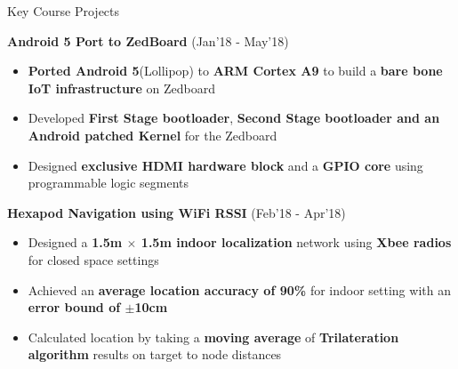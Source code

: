 \documentclass{resume}
\newcommand{\sepval}{-0.5em}
\begin{document}
\begin{rSection}{Key Course Projects}

\vspace{-.4cm}

\item {\bf Android 5 Port to ZedBoard} \hfill {(Jan'18 - May'18)}\\
[-0.4cm]

\begin{itemize}[leftmargin=*]

	\itemsep \sepval

	\item {\bf Ported Android 5}(Lollipop) to {\bf ARM Cortex A9} to build a {\bf bare bone IoT infrastructure} on Zedboard
	
	\item Developed {\bf First Stage bootloader}, {\bf Second Stage
		bootloader and an Android patched Kernel} for the Zedboard
	
	\item Designed {\bf exclusive HDMI hardware block} and a {\bf GPIO core} using programmable logic segments
	
\end{itemize}

\vspace{-0.1cm}
\item {\bf Hexapod Navigation using WiFi RSSI}  \hfill{(Feb'18 - Apr'18)}\\
[-0.4cm]

\begin{itemize}[leftmargin=*]

	\itemsep \sepval

	\item Designed a {\bf 1.5m $\times$ 1.5m indoor localization} network using {\bf Xbee radios} for closed space settings
	     
	\item Achieved an {\bf average location accuracy of 90\%} for indoor setting with an {\bf error bound of $\pm$10cm}
	
	\item Calculated location by taking a {\bf moving average} of {\bf Trilateration algorithm} results on target to node distances



\end{itemize}
\end{rSection}
\end{document}
